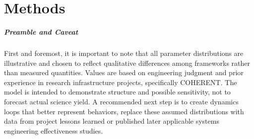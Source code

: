 \chapter{Methods}
\label{chapter:methods}
\paragraph{Preamble and Caveat} First and foremost, it is important to note that all parameter distributions are illustrative and chosen to reflect qualitative differences among frameworks rather than measured quantities.
Values are based on engineering judgment and prior experience in research infrastructure projects, specifically COHERENT.
The model is intended to demonstrate structure and possible sensitivity, not to forecast actual science yield.
A recommended next step is to create dynamics loops that better represent behaviors, replace these assumed distributions with data from project lessons learned or
published later applicable systems engineering effectiveness studies.\\

